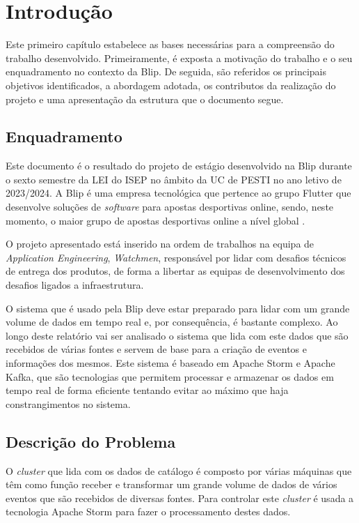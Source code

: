 \chapter{Introdução} 	
\label{sec:1-Introducao}

Este primeiro capítulo estabelece as bases necessárias para a compreensão do trabalho desenvolvido. 
Primeiramente, é exposta a motivação do trabalho e o seu enquadramento no contexto da Blip. 
De seguida, são referidos os principais objetivos identificados, a abordagem adotada, os contributos 
da realização do projeto e uma apresentação da estrutura que o documento segue.

\section{Enquadramento}

Este documento é o resultado do projeto de estágio desenvolvido na Blip durante o sexto semestre 
da \ac{LEI} do \ac{ISEP} no âmbito da \ac{UC} de \ac{PESTI} no ano letivo de 2023/2024. A Blip é 
uma empresa tecnológica que pertence ao grupo Flutter que desenvolve soluções de \textit{software} 
para apostas desportivas online, sendo, neste momento, o maior grupo de apostas desportivas online 
a nível global \cite{blip}.

O projeto apresentado está inserido na ordem de trabalhos na equipa de \textit{Application Engineering},
\textit{Watchmen}, responsável por lidar com desafios técnicos de entrega dos produtos, de forma
a libertar as equipas de desenvolvimento dos desafios ligados a infraestrutura.

O sistema que é usado pela Blip deve estar preparado para lidar com um grande volume de dados em 
tempo real e, por consequência, é bastante complexo. Ao longo deste relatório vai ser analisado 
o sistema que lida com este dados que são recebidos de várias fontes e servem de base para a criação 
de eventos e informações dos mesmos. Este sistema é baseado em Apache Storm e Apache Kafka, que são 
tecnologias que permitem processar e armazenar os dados em tempo real de forma eficiente tentando 
evitar ao máximo que haja constrangimentos no sistema.

\section{Descrição do Problema}

O \textit{\gls{cluster}} que lida com os dados de catálogo é composto por várias máquinas que têm
como função receber e transformar um grande volume de dados de vários eventos que são recebidos de 
diversas fontes. Para controlar este \textit{cluster} é usada a tecnologia Apache Storm para fazer 
o processamento destes dados.

